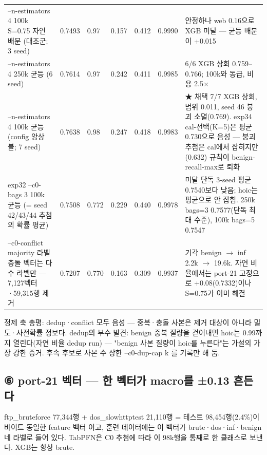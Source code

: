 \begin{longtable}
{}--n-estimators 4 100k S=\allowbreak{}0.75 자연 배분 (대조군; 3 seed) & 0.7493 & 0.97 & 0.157 & 0.412 & 0.9990 & 안정하나 web 0.16으로 XGB 미달 — 균등 배분이 +\allowbreak{}0.015 \\
{}--n-estimators 4 250k 균등 (6 seed) & 0.7614 & 0.97 & 0.242 & 0.411 & 0.9985 & 6/\allowbreak{}6 XGB 상회 0.759–0.766; 100k와 동급, 비용 2.5× \\
{}--n-estimators 4 100k 균등 (config 앙상블; 7 seed) & 0.7638 & 0.98 & 0.247 & 0.418 & 0.9983 & ★ 채택 7/\allowbreak{}7 XGB 상회, 범위 0.011, seed 46 붕괴 소멸(0.769). exp34 cal-선택(K=\allowbreak{}5)은 평균 0.730으로 음성 — 붕괴 추첨은 cal에서 잡히지만(0.632) 규칙이 benign-recall-max로 퇴화 \\
{}exp32 --c0-bags 3 100k 균등 (=\allowbreak{} seed 42/\allowbreak{}43/\allowbreak{}44 추첨의 확률 평균) & 0.7508 & 0.772 & 0.229 & 0.440 & 0.9978 & 미달 단독 3-seed 평균 0.7540보다 낮음; hoic는 평균으로 안 잡힘. 250k bags=\allowbreak{}3 0.7577(단독 최대 수준), 100k bags=\allowbreak{}5 0.7547 \\
{}--c0-conflict majority 라벨 충돌 벡터는 다수 라벨만 — 7,127벡터·59,315행 제거 & 0.7207 & 0.770 & 0.163 & 0.309 & 0.9937 & 기각 benign \ensuremath{\rightarrow} inf 2.2k \ensuremath{\rightarrow} 19.6k. 자연 비율에서는 port-21 고정으로 +\allowbreak{}0.08(0.7332)이나 S=\allowbreak{}0.75가 이미 해결 \\
\bottomrule
\end{longtable}
\endgroup
정제 축 총평: dedup·conflict 모두 음성 — 중복·충돌 사본은 제거 대상이 아니라 밀도·사전확률 정보다. dedup의 부수 발견: benign 중복 질량을 걷어내면 hoic는 0.99까지 열린다(자연 비율 dedup run) — "benign 사본 질량이 hoic를 누른다"는 가설의 가장 강한 증거. 후속 후보로 사본 수 상한 --c0-dup-cap k 를 기록만 해 둠.

\subsection*{⑥ port-21 벡터 — 한 벡터가 macro를 ±0.13 흔든다}
ftp\_\allowbreak{}bruteforce 77,344행 +\allowbreak{} dos\_\allowbreak{}slowhttptest 21,110행 =\allowbreak{} 테스트 98,454행(2.4\%)이 바이트 동일한 feature 벡터 이고, 훈련 데이터에는 이 벡터가 brute·dos·inf·benign 네 라벨로 들어 있다. TabPFN은 C0 추첨에 따라 이 98k행을 통째로 한 클래스로 보낸다. XGB는 항상 brute.

